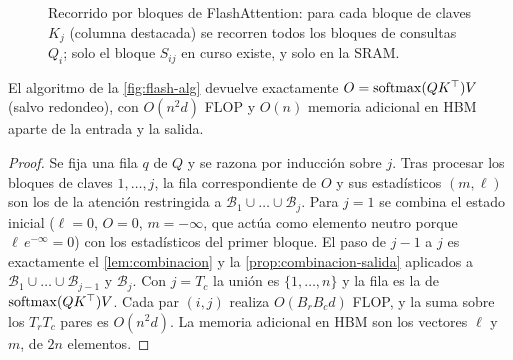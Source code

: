 \begin{figure}[h]
\centering
{}
\caption{Recorrido por bloques de FlashAttention: para cada bloque de claves $K_j$ (columna destacada) se recorren todos los bloques de consultas $Q_i$; solo el bloque $S_{ij}$ en curso existe, y solo en la SRAM.}
\label{fig:flash-bloques}
\end{figure}

\begin{teorema}\label{teo:flash-exacto}
El algoritmo de la \cref{fig:flash-alg} devuelve exactamente $O=\operatorname{softmax}(QK^{\top})V$ (salvo redondeo), con $O(n^{2}d)$ FLOP y $O(n)$ memoria adicional en HBM aparte de la entrada y la salida.
\end{teorema}

\begin{proof}
Se fija una fila $q$ de $Q$ y se razona por inducción sobre $j$. Tras procesar los bloques de claves $1,\dots,j$, la fila correspondiente de $O$ y sus estadísticos $(m,\ell)$ son los de la atención restringida a $\mathcal{B}_1\cup\dots\cup\mathcal{B}_j$. Para $j=1$ se combina el estado inicial ($\ell=0$, $O=0$, $m=-\infty$, que actúa como elemento neutro porque $\ell\,e^{-\infty}=0$) con los estadísticos del primer bloque. El paso de $j-1$ a $j$ es exactamente el \cref{lem:combinacion} y la \cref{prop:combinacion-salida} aplicados a $\mathcal{B}_1\cup\dots\cup\mathcal{B}_{j-1}$ y $\mathcal{B}_j$. Con $j=T_c$ la unión es $\{1,\dots,n\}$ y la fila es la de $\operatorname{softmax}(QK^{\top})V$. Cada par $(i,j)$ realiza $O(B_rB_cd)$ FLOP, y la suma sobre los $T_rT_c$ pares es $O(n^{2}d)$. La memoria adicional en HBM son los vectores $\ell$ y $m$, de $2n$ elementos.
\end{proof}

